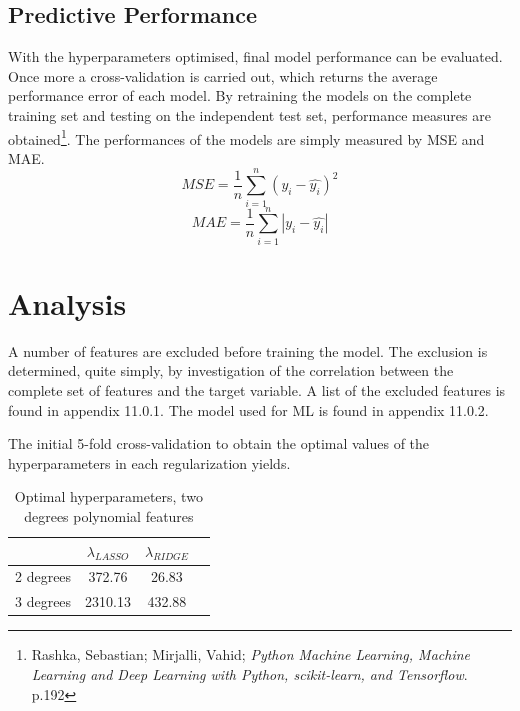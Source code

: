 \documentclass[12pt,a4paper]{article}
\begin{document}
\subsection{Predictive Performance}
With the hyperparameters optimised, final model performance can be evaluated. Once more a cross-validation is carried out, which returns the average performance error of each model. By retraining the models on the complete training set and testing on the independent test set, performance measures are obtained\footnote{Rashka, Sebastian; Mirjalli, Vahid; \textit{Python Machine Learning, Machine Learning and Deep Learning with Python, scikit-learn, and Tensorflow}. p.192}. \newline The performances of the models are simply measured by MSE and MAE. \newline
$$ MSE = \frac{1}{n}\sum_{i=1}^{n}(y_i-\hat{y_i})^2$$
$$ MAE = \frac{1}{n}\sum_{i=1}^{n}|y_i-\hat{y_i}|$$



\section{Analysis}
A number of features are excluded before training the model. The exclusion is determined, quite simply, by investigation of the correlation between the complete set of features and the target variable. A list of the excluded features is found in appendix 11.0.1. The model used for ML is found in appendix 11.0.2.  

The initial 5-fold cross-validation to obtain the optimal values of the hyperparameters in each regularization yields. 
\begin{table}[h!]
\begin{center}
\caption{Optimal hyperparameters, two degrees polynomial features\label{time}}
\begin{tabular}{ c | c  c  c } 
  & $\lambda_{LASSO}$ & $\lambda_{RIDGE}$ \\ \hline
2 degrees  & 372.76 & 26.83 \\ \hline
3 degrees  & 2310.13 & 432.88
\end{tabular}
\end{center}
\end{table} 
\end{document}
